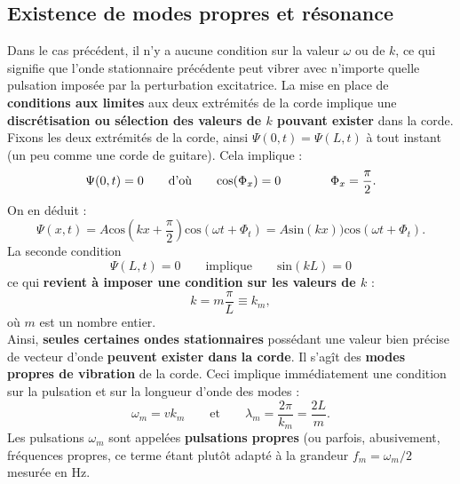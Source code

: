 \documentclass[11pt,a4paper]{report}
\begin{document}
\subsection{Existence de modes propres et résonance}

Dans le cas précédent, il n'y a aucune condition sur la valeur $\omega$ ou de $k$, ce qui signifie que l'onde stationnaire précédente peut vibrer avec n'importe quelle pulsation imposée par la perturbation excitatrice. La mise en place de \textbf{conditions aux limites} aux deux extrémités de la corde implique une \textbf{discrétisation ou sélection des valeurs de $k$ pouvant exister} dans la corde.\\

Fixons les deux extrémités de la corde, ainsi $\Psi(0,t) = \Psi(L,t)$ à tout instant (un peu comme une corde de guitare). Cela implique :
\begin{equation}
	\Psi(0,t) = 0 \qquad\text{d'où}\qquad \text{cos}(\Phi_x) = 0 \qquad\text\qquad \Phi_x = \frac{\pi}{2}. 
\end{equation}
On en déduit :
\begin{equation}
	\Psi(x,t) = A \text{cos}(kx + \frac{\pi}{2})\text{cos}(\omega t + \Phi_t) = A \text{sin}(kx))\text{cos}(\omega t + \Phi_t).
\end{equation}
La seconde condition
\begin{equation}
	\Psi(L,t) = 0 \qquad\text{implique}\qquad \text{sin}(kL) = 0
\end{equation}
ce qui \textbf{revient à imposer une condition sur les valeurs de $k$} :
\begin{equation}
	k = m\frac{\pi}{L} \equiv k_m,
\end{equation}
où $m$ est un nombre entier.\\

Ainsi, \textbf{seules certaines ondes stationnaires} possédant une valeur bien précise de vecteur d'onde \textbf{peuvent exister dans la corde}. Il s'agît des \textbf{modes propres de vibration} de la corde. Ceci implique immédiatement une condition sur la pulsation et sur la longueur d'onde des modes :
\begin{equation}
	\omega_m = v k_m \qquad\text{et}\qquad \lambda_m = \frac{2\pi}{k_m} = \frac{2L}{m}.
\end{equation}
Les pulsations $\omega_m$ sont appelées \textbf{pulsations propres} (ou parfois, abusivement, fréquences propres, ce terme étant plutôt adapté à la grandeur $f_m = \omega_m/2$ mesurée en Hz.\\
\end{document}
